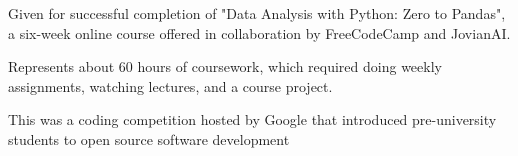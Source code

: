 \documentclass[]{resume-template}
\begin{document}
\begin{minipage}[t]{0.66\textwidth}
\begin{tightemize}
\item Given for successful completion of "Data Analysis with Python: Zero to Pandas", 
            a six-week online course offered in collaboration by FreeCodeCamp and JovianAI.
\item Represents about 60 hours of coursework, which required doing weekly assignments, watching lectures, and a course project.
\end{tightemize}
\sectionsep{}

\begin{tightemize}
\item This was a coding competition hosted by Google that introduced pre-university students to open source software development
\end{tightemize}
\sectionsep{}





\end{minipage} 
\end{document}
